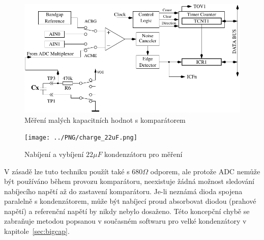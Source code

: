 \begin{figure}[H]
\centering
\includegraphics[width=.8\textwidth]{../FIG/Comparat.pdf}
\caption{Měření malých kapacitních hodnot s komparátorem}
\label{fig:comparat}
\end{figure}

\begin{figure}[H]
  \centering
    \texttt{[image: ../PNG/charge\_22uF.png]}
  \caption{Nabíjení a vybíjení \(22\mu F\) kondenzátoru pro měření}
  \label{pic:c22uF}
\end{figure}


V zásadě lze tuto techniku použít také s \(680\Omega\) odporem,
ale protože ADC nemůže být používáno během provozu komparátoru, neexistuje žádná
možnost sledování nabíjecího napětí až do zastavení komparátoru.
Je-li neznámá dioda spojena paralelně s kondenzátorem, může být nabíjecí proud
absorbovat diodou (prahové napětí) a referenční napětí by nikdy nebylo dosaženo.
Této koncepční chybě se zabraňuje metodou popsanou v současném softwaru pro velké kondenzátory
v kapitole~\ref{sec:bigcap}.
